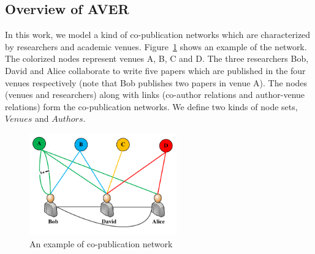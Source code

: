 \documentclass[9pt]{acm_proc_article-sp}
\begin{document}
\subsection{Overview of AVER}
In this work, we model a kind of co-publication networks which are characterized by researchers and academic venues. Figure~\ref{Fig2} shows an example of the network. The colorized nodes represent venues A, B, C and D. The three researchers Bob, David and Alice collaborate to write five papers which are published in the four venues respectively (note that Bob publishes two papers in venue A). The nodes (venues and researchers) along with links (co-author relations and author-venue relations) form the co-publication networks. We define two kinds of node sets, $Venues$ and $Authors$.
\begin{figure}[t]
\centering
\includegraphics [width=2.5in]{Fig2.pdf}
\caption{An example of co-publication network}
\label{Fig2}
\end{figure}
\end{document}
